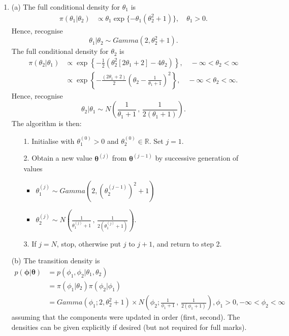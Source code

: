 \documentclass[12pt,BCOR2mm,DIV14,english]{scrreprt}
\theoremstyle{exmp}
\newcommand{\bmtheta}{\boldsymbol{\theta}}
\begin{document}
\begin{enumerate}
\item 

(a) The full conditional density for $\theta_1$ is
\begin{align*}
\pi(\theta_1|\theta_2)&\propto \theta_1 \exp\{-\theta_1(\theta_2^2+1)\}, \quad \theta_1 >0.
\end{align*}
Hence, recognise
\[
\theta_1|\theta_2 \sim Gamma(2,\theta_2^2 +1).
\]
The full conditional density for $\theta_2$ is
\begin{align*}
\pi(\theta_2|\theta_1)&\propto \exp\left\{-\frac{1}{2}(\theta_2^2[2\theta_1+2]-4\theta_2)\right\}, \quad -\infty<\theta_2 <\infty\\
&\propto \exp\left\{-\frac{(2\theta_1+2)}{2}\left(\theta_2 - \frac{1}{\theta_1+1}\right)^2   \right\}, \quad -\infty<\theta_2 <\infty .
\end{align*}
Hence, recognise
\[
\theta_2|\theta_1 \sim N\left(\frac{1}{\theta_1+1}\,,\,\frac{1}{2(\theta_1+1)}\right).
\]
The algorithm is then:
\begin{enumerate}
\item[1.] Initialise with $\theta_1^{(0)}>0$ and $\theta_2^{(0)}\in \mathbb{R}$. Set $j=1$. 
\item[2.] Obtain a new value $\bmtheta^{(j)}$ from
  $\bmtheta^{(j-1)}$ by successive generation of values
\begin{itemize}
\item $\theta_1^{(j)}\sim Gamma\left(2,\left(\theta_2^{(j-1)}\right)^2 +1\right)$
\item $\theta_2^{(j)}\sim N\left(\frac{1}{\theta_1^{(j)}+1}\,,\,\frac{1}{2(\theta_1^{(j)}+1)}\right).$
\end{itemize}
\item[3.] If $j=N$, stop, otherwise put $j$ to $j+1$, and return to step 2.
\end{enumerate}

(b) The transition density is
\begin{align*}
p(\boldsymbol{\phi}|\boldsymbol{\theta})&=p(\phi_1,\phi_2|\theta_1,\theta_2)\\
&=\pi(\phi_1|\theta_2)\pi(\phi_2|\phi_1)\\
&=Gamma(\phi_1; 2, \theta_2^2 +1) \times N\left(\phi_2; \frac{1}{\phi_1+1}\,,\,\frac{1}{2(\phi_1+1)}\right), \phi_1>0, -\infty < \phi_2 < \infty
\end{align*}
assuming that the components were updated in order (first, second). The densities can be given 
explicitly if desired (but not required for full marks).


\end{enumerate}
\end{document}
